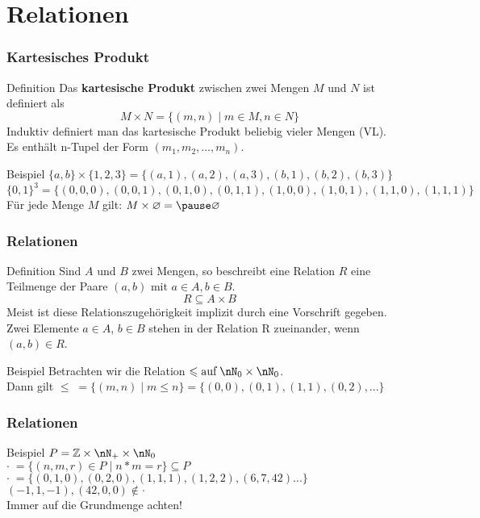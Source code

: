 \section{Relationen}

\begin{frame}
	\frametitle{Kartesisches Produkt}
	\begin{block}{Definition}
		Das \textbf{kartesische Produkt} zwischen zwei Mengen $M$ und $N$ ist definiert als
		$$M \times N = \{ (m,n) \mid m \in M, n \in N \}$$
		Induktiv definiert man das kartesische Produkt beliebig vieler Mengen (VL).\\
		Es enthält n-Tupel der Form $(m_1, m_2, ..., m_n)$.
	\end{block}

	\pause
	\begin{block}{Beispiel}
		$\{a,b\} \times \{1, 2, 3\} = \{(a, 1), (a, 2), (a, 3), (b, 1), (b, 2), (b, 3)\}$ \\
		$\{0, 1\}^3 = \{(0, 0, 0), (0, 0, 1), (0, 1, 0), (0, 1, 1), (1, 0, 0), (1, 0, 1), (1, 1, 0), (1, 1, 1)\} $ \\[0.5em]
		Für jede Menge $M$ gilt: $ M \times \emptyset = \pause \emptyset $
	\end{block}
\end{frame}

\begin{frame}
	\frametitle{Relationen}
	\begin{block}{Definition}
		Sind $A$ und $B$ zwei Mengen, so beschreibt eine Relation $R$ eine Teilmenge der Paare $(a,b) \text{ mit } a \in A, b \in B$.
		$$R \subseteq A \times B$$ Meist ist diese Relationszugehörigkeit implizit durch eine Vorschrift gegeben. \\
		Zwei Elemente $a \in A$, $b \in B$ stehen in der Relation R zueinander, wenn $(a, b) \in R$.
	\end{block}
	
	\pause
	\begin{block}{Beispiel}
		Betrachten wir die Relation $ \leq \text{auf} \; \nN_0 \times \nN_0 $. \\
		Dann gilt $ \leq \; = \{(m, n) \mid m \leq n \} = \{(0, 0), (0, 1), (1, 1), (0, 2), ...\} $
	\end{block}
\end{frame}

\begin{frame}
	\frametitle{Relationen}	
	\begin{block}{Beispiel}
		$ P = \Z\times \nN_+ \times \nN_0 $ \\
		$ \cdot \; = \{(n, m, r) \in P \mid n * m = r \} \subseteq P $ \\[0.5em]
		\pause
		$ \cdot \; = \{(0, 1, 0), (0, 2, 0), (1, 1, 1), (1, 2, 2), (6, 7, 42) ...\} $ \\[0.5em]
		$ (-1, 1, -1), (42, 0, 0) \notin \cdot $\\[1em]
		\pause
		Immer auf die Grundmenge achten!
	\end{block}
\end{frame}

